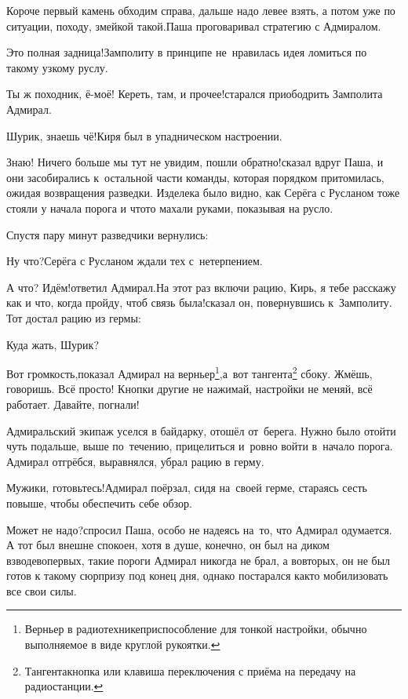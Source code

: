 \diagdash Короче первый камень обходим справа, дальше надо левее взять, а потом уже по ситуации, походу, змейкой такой.\mdash Паша проговаривал стратегию с Адмиралом. 

\diagdash Это полная задница!\mdash Замполиту в принципе не~нравилась идея ломиться по такому узкому руслу.

\diagdash Ты ж походник, ё-моё! Кереть, там, и прочее!\mdash старался приободрить Замполита Адмирал.

\diagdash Шурик, знаешь чё!\mdash Киря был в упадническом настроении.

\diagdash Знаю! Ничего больше мы тут не увидим, пошли обратно!\mdash сказал вдруг Паша, и они засобирались к~остальной части команды, которая порядком притомилась, ожидая возвращения разведки. Изделека было видно, как Серёга с Русланом тоже стояли у начала порога и что\sdash то махали руками, показывая на русло.

Спустя пару минут разведчики вернулись:

\diagdash Ну что?\mdash Серёга с Русланом ждали тех с~нетерпением.

\diagdash А что? Идём!\mdash ответил Адмирал.\mdash На этот раз включи рацию, Кирь, я тебе расскажу как и что, когда пройду, чтоб связь была!\mdash сказал он, повернувшись к~Замполиту. Тот достал рацию из гермы:

\diagdash Куда жать, Шурик?

\renewcommand*{\thefootnote}{\arabic{footnote}}
\setcounter{footnote}{0}
\diagdash Вот громкость,\mdash показал Адмирал на верньер\footnote{Верньер в радиотехнике\mdash приспособление для тонкой настройки, обычно выполняемое в виде круглой рукоятки.},\mdash а~вот тангента\footnote{Тангента\mdash кнопка или клавиша переключения с приёма на передачу на радиостанции.} сбоку. Жмёшь, говоришь. Всё просто! Кнопки другие не нажимай, настройки не меняй, всё работает. Давайте, погнали!

Адмиральский экипаж уселся в байдарку, отошёл от~берега. Нужно было отойти чуть подальше, выше по~течению, прицелиться и~ровно войти в~начало порога. Адмирал отгрёбся, выравнялся, убрал рацию в герму. 

\diagdash Мужики, готовьтесь!\mdash Адмирал поёрзал, сидя на~своей герме, стараясь сесть повыше, чтобы обеспечить себе обзор.

\diagdash Может не надо?\mdash спросил Паша, особо не надеясь на~то, что Адмирал одумается. А тот был внешне спокоен, хотя в душе, конечно, он был на диком взводе\mdash во\sdash первых, такие пороги Адмирал никогда не брал, а во\sdash вторых, он не был готов к такому сюрпризу под конец дня, однако постарался как\sdash то мобилизовать все свои силы.

